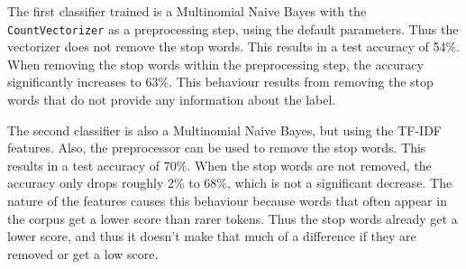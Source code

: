 \documentclass[onecolumn]{article}
\begin{document}
The first classifier trained is a Multinomial Naive Bayes with the \texttt{CountVectorizer} as a preprocessing step, using the default parameters. Thus the vectorizer does not remove the stop words. This results in a test accuracy of 54\%. When removing the stop words within the preprocessing step, the accuracy significantly increases to 63\%. This behaviour results from removing the stop words that do not provide any information about the label. 

The second classifier is also a Multinomial Naive Bayes, but using the TF-IDF features. Also, the preprocessor can be used to remove the stop words. This results in a test accuracy of 70\%. When the stop words are not removed, the accuracy only drops roughly 2\% to 68\%, which is not a significant decrease. The nature of the features causes this behaviour because words that often appear in the corpus get a lower score than rarer tokens. Thus the stop words already get a lower score, and thus it doesn't make that much of a difference if they are removed or get a low score.
\end{document}
